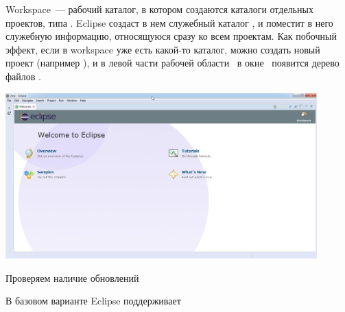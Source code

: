 \bigskip Workspace\ --- рабочий каталог, в котором создаются каталоги отдельных
проектов, типа . Eclipse создаст в нем служебный каталог
, и поместит в него служебную информацию, относящуюся сразу ко
всем проектам. Как побочный эффект, если в workspace уже есть какой-то каталог,
можно создать новый проект (например ), и в левой части рабочей
области \eclipse\ в окне \ появится дерево файлов
.

\bigskip{}

\bigskip\includegraphics[width=0.9\textwidth]{fig/EclipseMain.png}

\bigskip Проверяем наличие обновлений

\bigskip{}

\bigskip В базовом варианте Eclipse поддерживает


